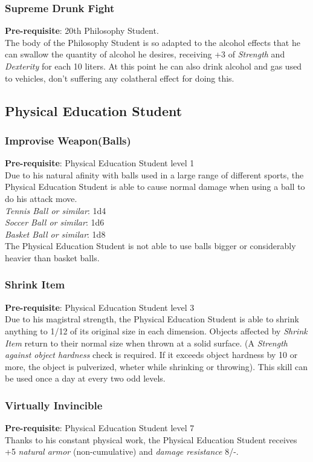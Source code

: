 \documentclass[ letterpaper,12pt]{article}
\begin{document}
\subsubsection{Supreme Drunk Fight}
 {\bf Pre-requisite}: 20th Philosophy Student.\\
 The body of the Philosophy Student is so adapted to the alcohol effects that he can swallow the quantity of alcohol he desires, receiving +3 of {\it Strength} and {\it Dexterity} for each 10 liters. At this point he can also drink alcohol and gas used to vehicles, don't suffering any colatheral effect for doing this.

\subsection{Physical Education Student}

\subsubsection{Improvise Weapon(Balls)}
{\bf Pre-requisite}: Physical Education Student level 1\\
 Due to his natural afinity with balls used in a large range of different sports, the Physical Education Student is able to cause normal damage when using a ball to do his attack move.\\
{\it Tennis Ball or similar}: 1d4\\
{\it Soccer Ball or similar}: 1d6\\
{\it Basket Ball or similar}: 1d8\\
The Physical Education Student is not able to use balls bigger or considerably heavier than basket balls.

\subsubsection{Shrink Item}
 {\bf Pre-requisite}: Physical Education Student level 3\\
 Due to his magistral strength, the Physical Education Student is able to shrink anything to 1/12 of its original size in each dimension. Objects affected by {\it Shrink Item} return to their normal size when thrown at a solid surface. (A {\it Strength against object hardness} check is required. If it exceeds object hardness by 10 or more, the object is pulverized, wheter while shrinking or throwing). This skill can be used once a day at every two odd levels.

\subsubsection{Virtually Invincible}
 {\bf Pre-requisite}: Physical Education Student level 7\\
 Thanks to his constant physical work, the Physical Education Student receives +5 {\it natural armor} (non-cumulative) and {\it damage resistance} 8/-.
\end{document}
